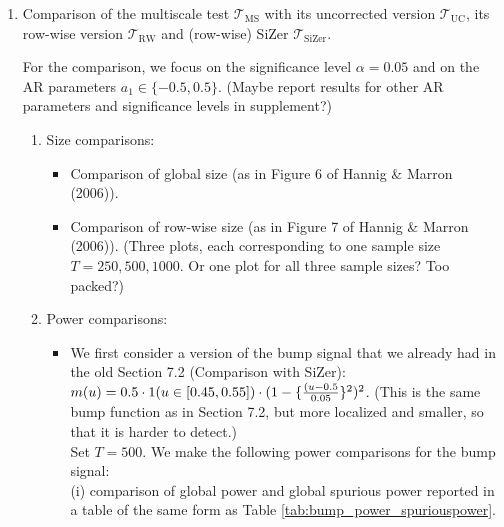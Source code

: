 \begin{enumerate}[label=(\arabic*),leftmargin=0.7cm]
\item Comparison of the multiscale test $\mathcal{T}_{\text{MS}}$ with its uncorrected version $\mathcal{T}_{\text{UC}}$, its row-wise version $\mathcal{T}_{\text{RW}}$ and (row-wise) SiZer $\mathcal{T}_{\text{SiZer}}$. 

For the comparison, we focus on the significance level $\alpha=0.05$ and on the AR parameters $a_1 \in \{-0.5,0.5\}$. (Maybe report results for other AR parameters and significance levels in supplement?)

\begin{enumerate}[label=(\alph*),leftmargin=0.7cm]

\item Size comparisons:
\begin{itemize}[label=--,leftmargin=0.5cm]
\item Comparison of global size (as in Figure 6 of Hannig \& Marron (2006)).
\item Comparison of row-wise size (as in Figure 7 of Hannig \& Marron (2006)). (Three plots, each corresponding to one sample size $T=250, 500, 1000$. Or one plot for all three sample sizes? Too packed?)  
\end{itemize}

\item Power comparisons: 
\begin{itemize}[label=--,leftmargin=0.5cm]
\item We first consider a version of the bump signal that we already had in the old Section 7.2 (Comparison with SiZer): $m(u) = 0.5 \cdot 1(u \in [0.45,0.55]) \cdot (1 - \{\frac{(u-0.5}{0.05}\}^2)^2$. (This is the same bump function as in Section 7.2, but more localized and smaller, so that it is harder to detect.) \\[0.1cm]
Set $T=500$. We make the following power comparisons for the bump signal: \\[0.1cm]
(i) comparison of global power and global spurious power reported in a table of the same form as Table \ref{tab:bump_power_spuriouspower}. 


\end{itemize}
\end{enumerate}
\end{enumerate}

